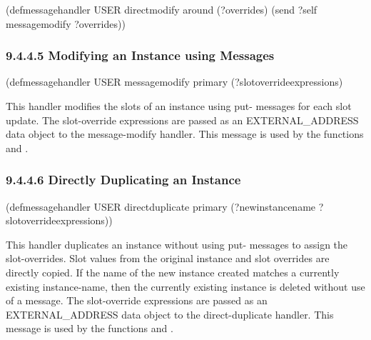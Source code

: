 \documentclass[letterpaper,10pt,english]{sphinxmanual}
\begin{document}
\begin{sphinxVerbatim}[commandchars=\\\{\}]
(defmessage\PYGZhy{}handler USER direct\PYGZhy{}modify around (?overrides)
  (send ?self message\PYGZhy{}modify ?overrides))
\end{sphinxVerbatim}


\subsubsection{9.4.4.5 Modifying an Instance using Messages}
\label{\detokenize{cool:modifying-an-instance-using-messages}}

\begin{sphinxVerbatim}[commandchars=\\\{\}]
(defmessage\PYGZhy{}handler USER message\PYGZhy{}modify primary
  (?slot\PYGZhy{}override\PYGZhy{}expressions)
\end{sphinxVerbatim}

This handler modifies the slots of an instance using put- messages for
each slot update. The slot-override expressions are passed as an
EXTERNAL\_ADDRESS data object to the message-modify handler. This message
is used by the functions  and
.


\subsubsection{9.4.4.6 Directly Duplicating an Instance}
\label{\detokenize{cool:directly-duplicating-an-instance}}

\begin{sphinxVerbatim}[commandchars=\\\{\}]
(defmessage\PYGZhy{}handler USER direct\PYGZhy{}duplicate primary
  (?new\PYGZhy{}instance\PYGZhy{}name ?slot\PYGZhy{}override\PYGZhy{}expressions))
\end{sphinxVerbatim}

This handler duplicates an instance without using put- messages to
assign the slot-overrides. Slot values from the original instance and
slot overrides are directly copied. If the name of the new instance
created matches a currently existing instance-name, then the currently
existing instance is deleted without use of a message. The slot-override
expressions are passed as an EXTERNAL\_ADDRESS data object to the
direct-duplicate handler. This message is used by the functions
 and .
\end{document}
